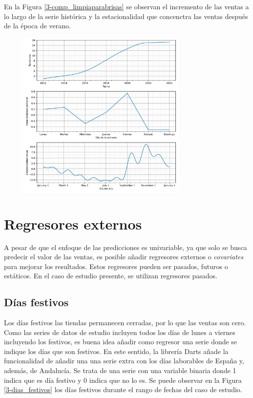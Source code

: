 En la Figura \ref*{3-comp_limpiaparabrisas} se observan el incremento de las ventas a lo largo de la serie histórica y la estacionalidad que concenctra las ventas después de la época de verano.

\begin{figure}[H]
	{\includegraphics[width=0.75\textwidth]{imagenes/comps_limpiaparabrisas.pdf}}
\end{figure}


\section{Regresores externos}

A pesar de que el enfoque de las predicciones es univariable, ya que solo se busca predecir el valor de las ventas, es posible añadir regresores externos o \textit{covariates} para mejorar los resultados. Estos regresores pueden ser pasados, futuros o estáticos. En el caso de estudio presente, se utilizan regresores pasados.

\subsection{Días festivos}

Los días festivos las tiendas permanecen cerradas, por lo que las ventas son cero. Como las series de datos de estudio incluyen todos los días de lunes a viernes incluyendo los festivos, es buena idea añadir como regresor una serie donde se indique los días que son festivos. En este sentido, la librería Darts añade la funcionalidad de añadir una una serie extra con los días laborables de España y, además, de Andalucía. Se trata de una serie con una variable binaria donde 1 indica que es día festivo y 0 indica que no lo es. Se puede observar en la Figura \ref*{3-dias_festivos} los días festivos durante el rango de fechas del caso de estudio.

